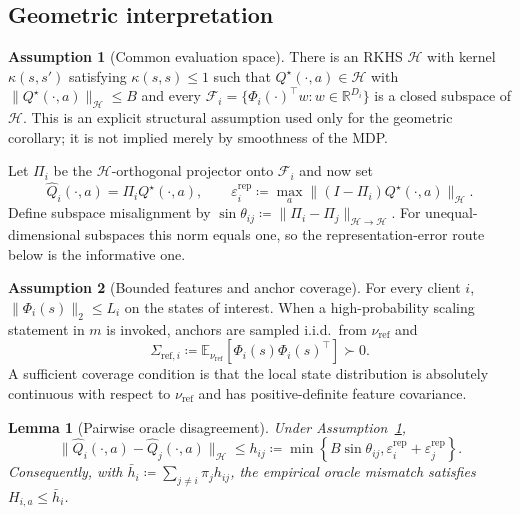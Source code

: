 \documentclass[sigconf,anonymous]{aamas}
\theoremstyle{plain}
\newtheorem{lemma}{Lemma}
\theoremstyle{definition}
\newtheorem{assumption}{Assumption}
\theoremstyle{remark}
\newcommand{\defeq}{\coloneqq}
\begin{document}
\subsection{Geometric interpretation}

\begin{assumption}[Common evaluation space]
\label{assum:common_rkhs}
There is an RKHS $\mathcal H$ with kernel
$\kappa(s,s')$ satisfying $\kappa(s,s)\le1$ such that
$Q^\star(\cdot,a)\in\mathcal H$ with
$\|Q^\star(\cdot,a)\|_{\mathcal H}\le B$ and every
$\mathcal F_i=\{\Phi_i(\cdot)^\top w:w\in\mathbb R^{D_i}\}$ is a closed
subspace of $\mathcal H$.  This is an explicit structural assumption
used only for the geometric corollary; it is not implied merely by
smoothness of the MDP.
\end{assumption}

Let $\Pi_i$ be the $\mathcal H$-orthogonal projector onto $\mathcal F_i$
and now set
\[
\hat Q_i(\cdot,a)=\Pi_iQ^\star(\cdot,a),\qquad
\varepsilon_i^{\mathrm{rep}}
\defeq
\max_a\|(I-\Pi_i)Q^\star(\cdot,a)\|_{\mathcal H}.
\]
Define subspace misalignment by
$\sin\theta_{ij}\defeq\|\Pi_i-\Pi_j\|_{\mathcal H\to\mathcal H}$.
For unequal-dimensional subspaces this norm equals one, so the
representation-error route below is the informative one.

\begin{assumption}[Bounded features and anchor coverage]
\label{assum:anchor}
For every client $i$,
$\|\Phi_i(s)\|_2\le L_i$ on the states of interest.  When a
high-probability scaling statement in $m$ is invoked, anchors are sampled
i.i.d.\ from $\nu_{\mathrm{ref}}$ and
\[
\Sigma_{\mathrm{ref},i}
\defeq
\mathbb E_{\nu_{\mathrm{ref}}}
[\Phi_i(s)\Phi_i(s)^\top]\succ0.
\]
A sufficient coverage condition is that the local state distribution is
absolutely continuous with respect to $\nu_{\mathrm{ref}}$ and has
positive-definite feature covariance.
\end{assumption}

\begin{lemma}[Pairwise oracle disagreement]
\label{lem:term_A}
Under Assumption~\ref{assum:common_rkhs},
\begin{equation}
\|\hat Q_i(\cdot,a)-\hat Q_j(\cdot,a)\|_{\mathcal H}
\le
h_{ij}
\defeq
\min\left\{
B\sin\theta_{ij},
\varepsilon_i^{\mathrm{rep}}+\varepsilon_j^{\mathrm{rep}}
\right\}.
\label{eq:pairwise_clean}
\end{equation}
Consequently, with
$\bar h_i\defeq\sum_{j\ne i}\pi_jh_{ij}$,
the empirical oracle mismatch satisfies $H_{i,a}\le\bar h_i$.
\end{lemma}
\end{document}
